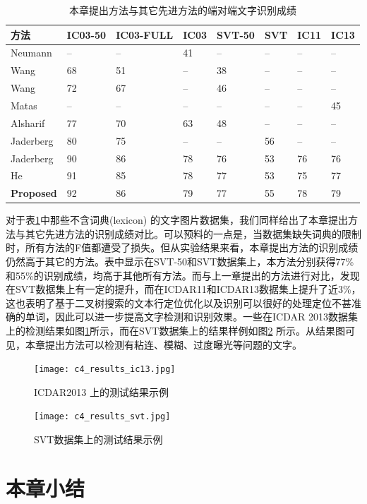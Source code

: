         \begin{table}[!h]
        \centering
        \caption{本章提出方法与其它先进方法的端对端文字识别成绩}
        \begin{tabular}{l|l l l l l l l}
        \hline
        方法 & IC03-50 & IC03-FULL & IC03 & SVT-50 & SVT & IC11 & IC13  \\
        \hline
        Neumann\cite{Neumann2010A} & -- & -- & 41 & -- & -- & -- & -- \\
        Wang\cite{Wang2012End} & 68 & 51 & -- & 38 & -- & -- & -- \\
        Wang\cite{Wang2012End} & 72 & 67 & -- & 46 & -- & -- & -- \\
        Matas\cite{Matas2014Scene} & -- & -- & -- & -- & -- & -- & 45 \\
        Alsharif\cite{Alsharif2013End} & 77 & 70 & 63 & 48 & -- & -- & -- \\
        Jaderberg\cite{Jaderberg2014Deep} & 80 & 75 & -- & -- & 56 & -- & -- \\
        Jaderberg\cite{Jaderberg2016Reading} & 90 & 86 & 78 & 76 & 53 & 76 & 76 \\
        He\cite{He2017scene} & 91 & 85 & 78 & 77 & 53 & 75 & 77 \\
        \textbf{Proposed} & 92 & 86 & 79 & 77 & 55 & 78 & 79 \\
        \hline
        \end{tabular}
        \label{tab.c4_recognition}
        \end{table}

        对于表\ref{tab.c4_recognition}中那些不含词典(lexicon) 的文字图片数据集，我们同样给出了本章提出方法与其它先进方法的识别成绩对比。可以预料的一点是，当数据集缺失词典的限制时，所有方法的F值都遭受了损失。但从实验结果来看，本章提出方法的识别成绩仍然高于其它的方法。表中显示在SVT-50和SVT数据集上，本方法分别获得77\%和55\%的识别成绩，均高于其他所有方法。而与上一章提出的方法进行对比，发现在SVT数据集上有一定的提升，而在ICDAR11和ICDAR13数据集上提升了近3\%，这也表明了基于二叉树搜索的文本行定位优化以及识别可以很好的处理定位不甚准确的单词，因此可以进一步提高文字检测和识别效果。一些在ICDAR 2013数据集上的检测结果如图\ref{fig.c4_results_ic13}所示，而在SVT数据集上的结果样例如图\ref{fig.c4_results_svt} 所示。从结果图可见，本章提出方法可以检测有粘连、模糊、过度曝光等问题的文字。

        \begin{figure}[!h]
        \centering
        \texttt{[image: c4\_results\_ic13.jpg]}
        \caption{ICDAR2013 上的测试结果示例}
        \label{fig.c4_results_ic13}
        \end{figure}

        \begin{figure}[!h]
        \centering
        \texttt{[image: c4\_results\_svt.jpg]}
        \caption{SVT数据集上的测试结果示例}
        \label{fig.c4_results_svt}
        \end{figure}


    \section{本章小结}


